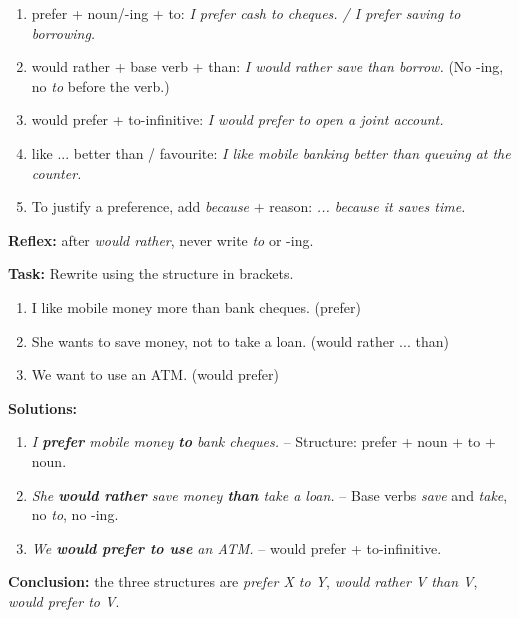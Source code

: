 \documentclass[11pt]{article}
\newcommand{\cle}[1]{{\popxbold\color{popdark}#1}}
\begin{document}
\begin{methode}
\begin{enumerate}
\item \cle{prefer + noun/-ing + to}: \emph{I prefer cash to cheques. / I prefer saving to borrowing.}
\item \cle{would rather + base verb + than}: \emph{I would rather save than borrow.} (No -ing, no \emph{to} before the verb.)
\item \cle{would prefer + to-infinitive}: \emph{I would prefer to open a joint account.}
\item \cle{like ... better than / favourite}: \emph{I like mobile banking better than queuing at the counter.}
\item To justify a preference, add \emph{because} + reason: \emph{... because it saves time.}
\end{enumerate}
\textbf{Reflex:} after \emph{would rather}, never write \emph{to} or -ing.
\end{methode}

\begin{exoresolu}
\textbf{Task:} Rewrite using the structure in brackets.
\begin{enumerate}
\item I like mobile money more than bank cheques. (prefer)
\item She wants to save money, not to take a loan. (would rather ... than)
\item We want to use an ATM. (would prefer)
\end{enumerate}
\tcblower
\textbf{Solutions:}
\begin{enumerate}
\item \emph{I \textbf{prefer} mobile money \textbf{to} bank cheques.} -- Structure: prefer + noun + to + noun.
\item \emph{She \textbf{would rather} save money \textbf{than} take a loan.} -- Base verbs \emph{save} and \emph{take}, no \emph{to}, no -ing.
\item \emph{We \textbf{would prefer to use} an ATM.} -- would prefer + to-infinitive.
\end{enumerate}
\textbf{Conclusion:} the three structures are \emph{prefer X to Y}, \emph{would rather V than V}, \emph{would prefer to V}.
\end{exoresolu}
\end{document}
